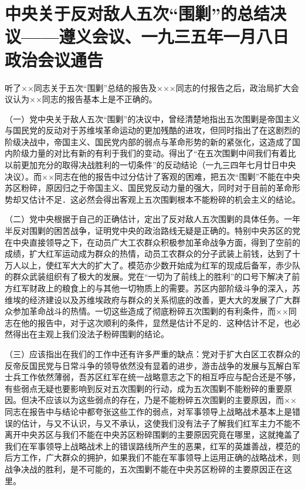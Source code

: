 \section[中央关于反对敌人五次“围剿”的总结决议——遵义会议、一九三五年一月八日政治会议通告]{中央关于反对敌人五次“围剿”的总结决议——遵义会议、一九三五年一月八日政治会议通告}


听了××同志关于五次“围剿”总结的报告及×××同志的付报告之后，政治局扩大会议认为××同志的报告基本上是不正确的。

（一）党中央关于敌人五次“围剿”的决议中，曾经清楚地指出五次围剿是帝国主义与国民党的反动对于苏维埃革命运动的更加残酷的进攻，但同时指出了在这剧烈的阶级决战中，帝国主义、国民党内部的弱点与革命形势的新的紧张化，这造成了国内阶级力量的对比有新的有利于我们的变动。得出了“在五次围剿中间我们有着比以前更加充分的取得决战胜利的一切条件”的反动结论（一九三四年七月廿日中央决议）。而××同志在他的报告中过分估计了客观的困难，把五次“围剿”不能在中央苏区粉碎，原因归之于帝国主义、国民党反动力量的强大，同时对于目前的革命形势却又估计不足．这必然会得出客观上五次围剿根本不能粉碎的机会主义的结论。

（二）党中央根据于自己的正确估计，定出了反对敌人五次围剿的具体任务。一年半反对围剿的困苦战争，证明党中央的政治路线无疑是正确的。特别中央苏区的党在中央直接领导之下，在动员广大工农群众积极参加革命战争方面，得到了空前的成绩，扩大红军运动成为群众的热情，动员工农群众的分子武装上前钱，达到了十万人以上，使红军大大的扩大了。模范亦少数开始成为红军的现成后备军，赤少队的群众武装组织有了极大的发展。党在“一切为了前线上的胜利”的口号下解决了前方红军财政上的粮食上的与其他一切物质上的需要。苏区内部阶级斗争的深入，苏维埃的经济建设以及苏维埃政府与群众的关系彻底的改善，更大大的发展了广大群众参加革命战斗的热情。一切这些造成了彻底粉碎五次围剿的有利条件，而××同志在他的报告中，对于这次顺利的条件，显然是估计不足的．这种估计不足，也必然得出在主观上我们没法子粉碎围剿的结论。

（三）应该指出在我们的工作中还有许多严重的缺点：党对于扩大白区工农群众的反帝反国民党与日常斗争的领导依然没有显着的进步，游击战争的发展与瓦解白军士兵工作依然薄弱，吾苏区红军在统一战略意志之下的相互呼应与配合还是不够，有些弱点无疑也要影响到反对五次围剿的行动，成为五次围剿不能粉碎的重要原因。但决不应该以为这些弱点的存在，乃是不能粉碎五次围剿的主要原因，而××同志在报告中与结论中都夸张这些工作的弱点，对军事领导上战略战术基本上是错误的估计，与又不认识，与又不承认，这使我们没有法子了解我们红军主力不能不离开中央苏区与我们不能在中央苏区粉碎围剿的主要原因究竟在哪里，这就掩盖了我们在军事领导上战略战术上的错误路线所产生的恶果，红军的英雄善战，模范的后方工作，广大群众的拥护，如果我们不能在军事领导上运用正确的战略战术，则战争决战的胜利，是不可能的，五次围剿不能在中央苏区粉碎的主要原因正在这里。

